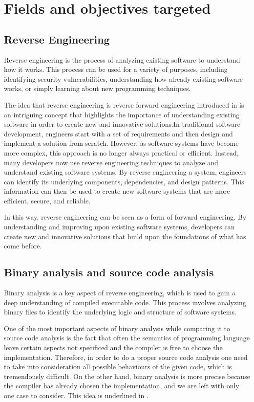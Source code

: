 \section{Fields and objectives targeted}
\subsection{Reverse Engineering} \label{section:reverse}
Reverse engineering is the process of analyzing existing software to understand how it works. 
This process can be used for a variety of purposes, including identifying security vulnerabilities,
understanding how already existing software works, or simply learning about new programming techniques.

The idea that reverse engineering is reverse forward engineering introduced in \cite{baxter} is an 
intriguing concept that highlights the importance of understanding existing software in order to 
create new and innovative solutions.In traditional software development, engineers start with a 
set of requirements and then design and implement a solution from scratch. However, as software 
systems have become more complex, this approach is no longer always practical or efficient.
Instead, many developers now use reverse engineering techniques to analyze and understand existing
software systems. By reverse engineering a system, engineers can identify its underlying components,
dependencies, and design patterns. This information can then be used to create new software systems
that are more efficient, secure, and reliable.

In this way, reverse engineering can be seen as a form of forward engineering. By understanding and
improving upon existing software systems, developers can create new and innovative solutions that 
build upon the foundations of what has come before.

\subsection{Binary analysis and source code analysis} \label{section:binary}
Binary analysis is a key aspect of reverse engineering, which is used to gain a deep understanding
of compiled executable code. This process involves analyzing binary files to identify the underlying
logic and structure of software systems.

One of the most important aspects of binary analysis while comparing it to source code analysis is
the fact that often the semantics of programming language leave certain aspects not specificed and
the compiler is free to choose the implementation. Therefore, in order to do a proper source code
analysis one need to take into consideration all possible behaviours of the given code, which is
tremendously difficult. On the other hand, binary analysis is more precise because the compiler
has already chosen the implementation, and we are left with only one case to consider. This idea
is underlined in \cite{whatyousee}.


